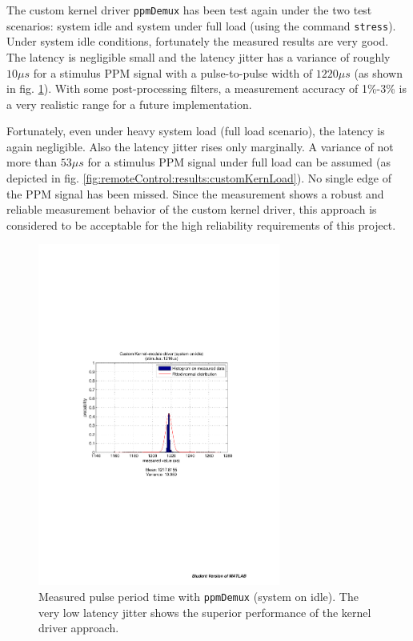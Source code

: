 The custom kernel driver \texttt{ppmDemux} has been test again under the two test scenarios: system idle and system under full load (using the command \texttt{stress}). Under system idle conditions, fortunately the measured results are very good. The latency is negligible small and the latency jitter has a variance of roughly $10\mu s$ for a stimulus PPM signal with a pulse-to-pulse width of $1220\mu s$ (as shown in fig. \ref{fig:remoteControl:results:customKernIdle}). With some post-processing filters, a measurement accuracy of 1\%-3\% is a very realistic range for a future implementation.

Fortunately, even under heavy system load (full load scenario), the latency is again negligible. Also the latency jitter rises only marginally. A variance of not more than $53\mu s$ for a stimulus PPM signal under full load can be assumed (as depicted in fig. \ref{fig:remoteControl:results:customKernLoad}). No single edge of the PPM signal has been missed. Since the measurement shows a robust and reliable measurement behavior of the custom kernel driver, this approach is considered to be acceptable for the high reliability requirements of this project.

\begin{figure}[H]
    \centering
    \includegraphics[width=0.71\textwidth]{fig/ch-ppm-kernel-driver/customKern_woLoad}
    \caption[Measured pulse period time with \texttt{ppmDemux} (system on idle)]{Measured pulse period time with \texttt{ppmDemux} (system on idle). The very low latency jitter shows the superior performance of the kernel driver approach.}
    \label{fig:remoteControl:results:customKernIdle}
\end{figure}

